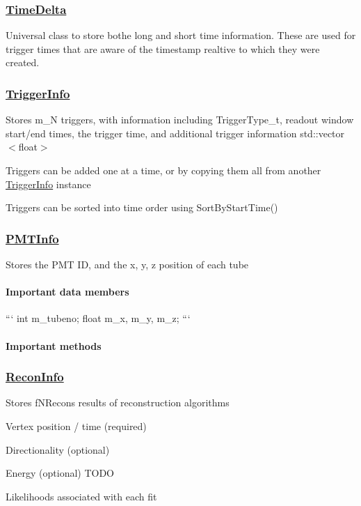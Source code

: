 \subsubsection*{\hyperlink{classTimeDelta}{Time\-Delta}}

Universal class to store bothe long and short time information. These are used for trigger times that are aware of the timestamp realtive to which they were created.

\subsubsection*{\hyperlink{classTriggerInfo}{Trigger\-Info}}

Stores {\ttfamily m\-\_\-\-N} triggers, with information including {\ttfamily Trigger\-Type\-\_\-t}, readout window start/end times, the trigger time, and additional trigger information {\ttfamily std\-::vector$<$float$>$}

Triggers can be added one at a time, or by copying them all from another {\ttfamily \hyperlink{classTriggerInfo}{Trigger\-Info}} instance

Triggers can be sorted into time order using {\ttfamily Sort\-By\-Start\-Time()}

\subsubsection*{\hyperlink{classPMTInfo}{P\-M\-T\-Info}}

Stores the P\-M\-T I\-D, and the x, y, z position of each tube

\paragraph*{Important data members}

``` int m\-\_\-tubeno; float m\-\_\-x, m\-\_\-y, m\-\_\-z; ```

\paragraph*{Important methods}

{\ttfamily  }

\subsubsection*{\hyperlink{classReconInfo}{Recon\-Info}}

Stores {\ttfamily f\-N\-Recons} results of reconstruction algorithms
\begin{DoxyItemize}
\item Vertex position / time (required)
\item Directionality (optional)
\item Energy (optional) T\-O\-D\-O
\item Likelihoods associated with each fit
\end{DoxyItemize}

